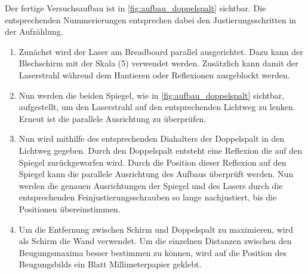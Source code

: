 \documentclass[12pt,english,ngerman]{scrartcl}
\begin{document}
Der fertige Versuchsaufbau ist in \autoref{fig:aufbau_doppelspalt} sichtbar.
Die entsprechenden Nummerierungen entsprechen dabei den Justierungsschritten in
der Aufzählung.

\begin{enumerate}
	\item Zunächst wird der Laser am Breadboard parallel ausgerichtet. Dazu kann der
	      Blechschirm mit der Skala (5) verwendet werden. Zusätzlich kann damit der
	      Laserstrahl während dem Hantieren oder Reflexionen ausgeblockt werden.
	\item Nun werden die beiden Spiegel, wie in \autoref{fig:aufbau_doppelspalt}
	      sichtbar, aufgestellt, um den Laserstrahl auf den entsprechenden Lichtweg zu
	      lenken. Erneut ist die parallele Ausrichtung zu überprüfen.
	\item Nun wird mithilfe des entsprechenden Diahalters der Doppelspalt in den Lichtweg
	      gegeben. Durch den Doppelspalt entsteht eine Reflexion die auf den Spiegel
	      zurückgeworfen wird. Durch die Position dieser Reflexion auf den Spiegel kann
	      die parallele Ausrichtung des Aufbaus überprüft werden. Nun werden die genauen
	      Ausrichtungen der Spiegel und des Lasers durch die entsprechenden
	      Feinjustierungsschrauben so lange nachjustiert, bis die Positionen
	      übereinstimmen.
	\item Um die Entfernung zwischen Schirm und Doppelspalt zu maximieren, wird als
	      Schirm die Wand verwendet. Um die einzelnen Distanzen zwischen den
	      Beugungsmaxima besser bestimmen zu können, wird auf die Position des
	      Beugungsbilds ein Blatt Millimeterpapier geklebt.
\end{enumerate}
\end{document}

